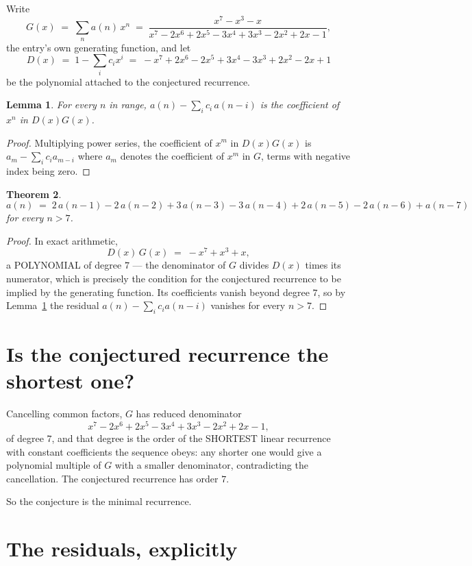 \documentclass[11pt,a4paper]{article}
\theoremstyle{plain}
\newtheorem{theorem}{Theorem}
\newtheorem{lemma}[theorem]{Lemma}
\theoremstyle{definition}
\begin{document}
Write
\[
G(x)\;=\;\sum_{n}a(n)\,x^{n}\;=\;\frac{x^{7} - x^{3} - x}{x^{7} - 2 x^{6} + 2 x^{5} - 3 x^{4} + 3 x^{3} - 2 x^{2} + 2 x - 1},
\]
the entry's own generating function, and let
\[
D(x)\;=\;1-\sum_i c_i x^{i}\;=\;- x^{7} + 2 x^{6} - 2 x^{5} + 3 x^{4} - 3 x^{3} + 2 x^{2} - 2 x + 1
\]
be the polynomial attached to the conjectured recurrence.

\begin{lemma}\label{lem:key}
For every $n$ in range, $a(n)-\sum_i c_i\,a(n-i)$ is the coefficient of $x^{n}$ in
$D(x)G(x)$.
\end{lemma}

\begin{proof}
Multiplying power series, the coefficient of $x^{m}$ in $D(x)G(x)$ is
$a_m-\sum_i c_i a_{m-i}$ where $a_m$ denotes the coefficient of $x^{m}$ in $G$, terms with
negative index being zero.
\end{proof}

\begin{theorem}
\[
a(n)\;=\;2\,a(n-1) - 2\,a(n-2) + 3\,a(n-3) - 3\,a(n-4) + 2\,a(n-5) - 2\,a(n-6) + a(n-7)
\]
for every $n>7$.
\end{theorem}

\begin{proof}
In exact arithmetic,
\[
D(x)\,G(x)\;=\;- x^{7} + x^{3} + x,
\]
a POLYNOMIAL of degree $7$ --- the denominator of $G$ divides $D(x)$ times its numerator,
which is precisely the condition for the conjectured recurrence to be implied by the
generating function. Its coefficients vanish beyond degree $7$, so by
Lemma~\ref{lem:key} the residual $a(n)-\sum_ic_ia(n-i)$ vanishes for every
$n>7$.
\end{proof}

\section{Is the conjectured recurrence the shortest one?}

Cancelling common factors, $G$ has reduced denominator
\[
x^{7} - 2 x^{6} + 2 x^{5} - 3 x^{4} + 3 x^{3} - 2 x^{2} + 2 x - 1,
\]
of degree $7$, and that degree is the order of the SHORTEST linear recurrence with
constant coefficients the sequence obeys: any shorter one would give a polynomial multiple of
$G$ with a smaller denominator, contradicting the cancellation. The conjectured recurrence has
order $7$.

So the conjecture is the minimal recurrence.

\section{The residuals, explicitly}
\end{document}
